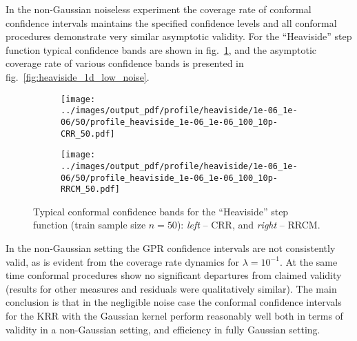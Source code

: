 \documentclass[10pt, conference, compsocconf]{IEEEtran}
\begin{document}
In the non-Gaussian noiseless experiment the coverage rate of conformal confidence
intervals maintains the specified confidence levels and all conformal procedures
demonstrate very similar asymptotic validity. For the ``Heaviside'' step function
typical confidence bands are shown in fig.~\ref{fig:nongauss_1d_heaviside}, and the
asymptotic coverage rate of various confidence bands is presented in
fig.~\ref{fig:heaviside_1d_low_noise}.

\begin{figure}%
  \centering
  \begin{subfigure}[b]{0.5\linewidth}
    \texttt{[image: ../images/output\_pdf/profile/heaviside/1e-06\_1e-06/50/profile\_heaviside\_1e-06\_1e-06\_100\_10p-CRR\_50.pdf]}
  \end{subfigure}%
  \begin{subfigure}[b]{0.5\linewidth}
    \texttt{[image: ../images/output\_pdf/profile/heaviside/1e-06\_1e-06/50/profile\_heaviside\_1e-06\_1e-06\_100\_10p-RRCM\_50.pdf]}
  \end{subfigure}
  \caption{Typical conformal confidence bands for the ``Heaviside'' step function
  (train sample size $n=50$): \textit{left} -- CRR, and \textit{right} -- RRCM.}
  \label{fig:nongauss_1d_heaviside}
\end{figure}

In the non-Gaussian setting the GPR confidence intervals are not consistently valid,
as is evident from the coverage rate dynamics for $\lambda=10^{-1}$. At the same time
conformal procedures show no significant departures from claimed validity (results
for other measures and residuals were qualitatively similar). The main conclusion
is that in the negligible noise case the conformal confidence intervals for the KRR
with the Gaussian kernel perform reasonably well both in terms of validity in a
non-Gaussian setting, and efficiency in fully Gaussian setting.
\end{document}
